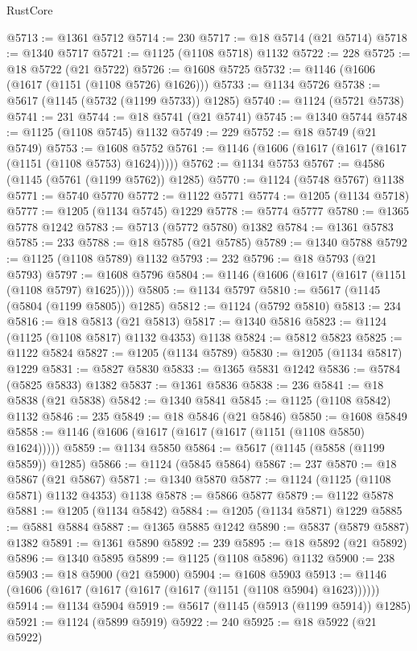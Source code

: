 \begin{lexlean}{RustCore}
\begin{coremodule}
@5713 := @1361 @5712
@5714 := 230
@5717 := @18 @5714 (@21 @5714)
@5718 := @1340 @5717
@5721 := @1125 (@1108 @5718) @1132
@5722 := 228
@5725 := @18 @5722 (@21 @5722)
@5726 := @1608 @5725
@5732 := @1146 (@1606 (@1617 (@1151 (@1108 @5726) @1626)))
@5733 := @1134 @5726
@5738 := @5617 (@1145 (@5732 (@1199 @5733)) @1285)
@5740 := @1124 (@5721 @5738)
@5741 := 231
@5744 := @18 @5741 (@21 @5741)
@5745 := @1340 @5744
@5748 := @1125 (@1108 @5745) @1132
@5749 := 229
@5752 := @18 @5749 (@21 @5749)
@5753 := @1608 @5752
@5761 := @1146 (@1606 (@1617 (@1617 (@1617 (@1151 (@1108 @5753) @1624)))))
@5762 := @1134 @5753
@5767 := @4586 (@1145 (@5761 (@1199 @5762)) @1285)
@5770 := @1124 (@5748 @5767) @1138
@5771 := @5740 @5770
@5772 := @1122 @5771
@5774 := @1205 (@1134 @5718)
@5777 := @1205 (@1134 @5745) @1229
@5778 := @5774 @5777
@5780 := @1365 @5778 @1242
@5783 := @5713 (@5772 @5780) @1382
@5784 := @1361 @5783
@5785 := 233
@5788 := @18 @5785 (@21 @5785)
@5789 := @1340 @5788
@5792 := @1125 (@1108 @5789) @1132
@5793 := 232
@5796 := @18 @5793 (@21 @5793)
@5797 := @1608 @5796
@5804 := @1146 (@1606 (@1617 (@1617 (@1151 (@1108 @5797) @1625))))
@5805 := @1134 @5797
@5810 := @5617 (@1145 (@5804 (@1199 @5805)) @1285)
@5812 := @1124 (@5792 @5810)
@5813 := 234
@5816 := @18 @5813 (@21 @5813)
@5817 := @1340 @5816
@5823 := @1124 (@1125 (@1108 @5817) @1132 @4353) @1138
@5824 := @5812 @5823
@5825 := @1122 @5824
@5827 := @1205 (@1134 @5789)
@5830 := @1205 (@1134 @5817) @1229
@5831 := @5827 @5830
@5833 := @1365 @5831 @1242
@5836 := @5784 (@5825 @5833) @1382
@5837 := @1361 @5836
@5838 := 236
@5841 := @18 @5838 (@21 @5838)
@5842 := @1340 @5841
@5845 := @1125 (@1108 @5842) @1132
@5846 := 235
@5849 := @18 @5846 (@21 @5846)
@5850 := @1608 @5849
@5858 := @1146 (@1606 (@1617 (@1617 (@1617 (@1151 (@1108 @5850) @1624)))))
@5859 := @1134 @5850
@5864 := @5617 (@1145 (@5858 (@1199 @5859)) @1285)
@5866 := @1124 (@5845 @5864)
@5867 := 237
@5870 := @18 @5867 (@21 @5867)
@5871 := @1340 @5870
@5877 := @1124 (@1125 (@1108 @5871) @1132 @4353) @1138
@5878 := @5866 @5877
@5879 := @1122 @5878
@5881 := @1205 (@1134 @5842)
@5884 := @1205 (@1134 @5871) @1229
@5885 := @5881 @5884
@5887 := @1365 @5885 @1242
@5890 := @5837 (@5879 @5887) @1382
@5891 := @1361 @5890
@5892 := 239
@5895 := @18 @5892 (@21 @5892)
@5896 := @1340 @5895
@5899 := @1125 (@1108 @5896) @1132
@5900 := 238
@5903 := @18 @5900 (@21 @5900)
@5904 := @1608 @5903
@5913 := @1146 (@1606 (@1617 (@1617 (@1617 (@1617 (@1151 (@1108 @5904) @1623))))))
@5914 := @1134 @5904
@5919 := @5617 (@1145 (@5913 (@1199 @5914)) @1285)
@5921 := @1124 (@5899 @5919)
@5922 := 240
@5925 := @18 @5922 (@21 @5922)

\end{coremodule}
\end{lexlean}
